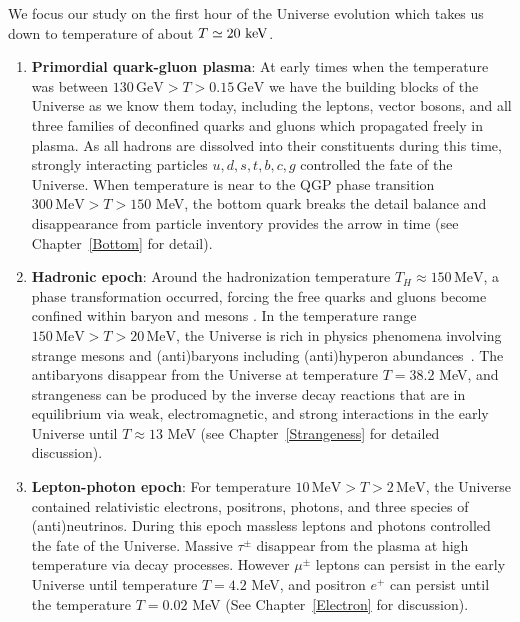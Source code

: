 We focus our study on the first hour of the Universe evolution which takes us down to temperature of about $T\simeq 20\text{ keV}$.
\begin{enumerate}
\item \textbf{Primordial quark-gluon plasma}: 
At early times when the temperature was between $130\,\mathrm{GeV}>T>0.15\,\mathrm{GeV}$ we have the building blocks of the Universe as we know them today, including the leptons, vector bosons, and all three families of deconfined quarks and gluons which propagated freely in plasma. As all hadrons are dissolved into their constituents during this time, strongly interacting particles $u,d,s,t,b,c,g$ controlled the fate of the Universe. When temperature is near to the QGP phase transition $300\, \mathrm{MeV}>T>150$ MeV, the bottom quark breaks the detail balance and disappearance from particle inventory provides the arrow in time (see Chapter~\ref{Bottom} for detail).
 
\item \textbf{Hadronic epoch}: Around the hadronization temperature $T_H\approx150\,\mathrm{MeV}$, a phase transformation occurred, forcing the free quarks and gluons become confined within baryon and mesons \cite{Letessier:2005qe}. In the temperature range $ 150\,\mathrm{MeV}>T>20\,\mathrm{MeV}$, the Universe is rich in physics phenomena involving strange mesons and (anti)baryons including (anti)hyperon abundances~\cite{Fromerth:2012fe,Yang:2021bko}. The antibaryons disappear from the Universe at temperature $T=38.2$ MeV, and strangeness can be produced by the inverse decay reactions that are in equilibrium via weak, electromagnetic, and strong interactions in the early Universe until $T\approx13$ MeV (see Chapter~\ref{Strangeness} for detailed discussion).

\item \textbf{Lepton-photon epoch}: For temperature $10\,\mathrm{MeV}>T>2\,\mathrm{MeV}$, the Universe contained relativistic electrons, positrons, photons, and three species of (anti)neutrinos. During this epoch massless leptons and photons controlled the fate of the Universe. Massive $\tau^\pm$ disappear from the plasma at high temperature via decay processes. However $\mu^\pm$ leptons can persist in the early Universe until temperature $T=4.2$ MeV, and positron $e^+$ can persist until the temperature $T=0.02$ MeV (See Chapter~\ref{Electron} for discussion).


\end{enumerate}
